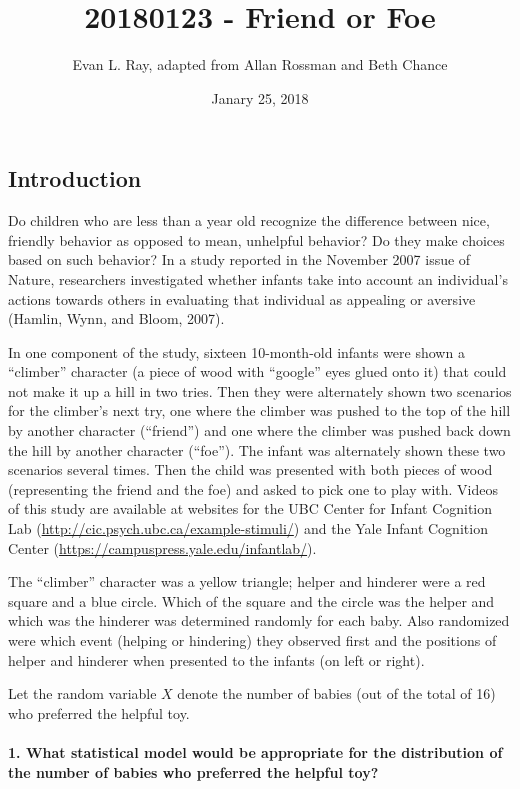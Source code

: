 \documentclass[]{article}
\title{20180123 - Friend or Foe}
\author{Evan L. Ray, adapted from Allan Rossman and Beth Chance}
\date{Janary 25, 2018}
\let\oldparagraph\paragraph
\renewcommand{\paragraph}[1]{\oldparagraph{#1}\mbox{}}
\begin{document}
\maketitle

\subsection{Introduction}\label{introduction}

Do children who are less than a year old recognize the difference
between nice, friendly behavior as opposed to mean, unhelpful behavior?
Do they make choices based on such behavior? In a study reported in the
November 2007 issue of Nature, researchers investigated whether infants
take into account an individual's actions towards others in evaluating
that individual as appealing or aversive (Hamlin, Wynn, and Bloom,
2007).

In one component of the study, sixteen 10-month-old infants were shown a
``climber'' character (a piece of wood with ``google'' eyes glued onto
it) that could not make it up a hill in two tries. Then they were
alternately shown two scenarios for the climber's next try, one where
the climber was pushed to the top of the hill by another character
(``friend'') and one where the climber was pushed back down the hill by
another character (``foe''). The infant was alternately shown these two
scenarios several times. Then the child was presented with both pieces
of wood (representing the friend and the foe) and asked to pick one to
play with. Videos of this study are available at websites for the UBC
Center for Infant Cognition Lab
(\url{http://cic.psych.ubc.ca/example-stimuli/}) and the Yale Infant
Cognition Center (\url{https://campuspress.yale.edu/infantlab/}).

The ``climber'' character was a yellow triangle; helper and hinderer
were a red square and a blue circle. Which of the square and the circle
was the helper and which was the hinderer was determined randomly for
each baby. Also randomized were which event (helping or hindering) they
observed first and the positions of helper and hinderer when presented
to the infants (on left or right).

Let the random variable \(X\) denote the number of babies (out of the
total of 16) who preferred the helpful toy.

\paragraph{1. What statistical model would be appropriate for the
distribution of the number of babies who preferred the helpful
toy?}\label{what-statistical-model-would-be-appropriate-for-the-distribution-of-the-number-of-babies-who-preferred-the-helpful-toy}
\end{document}
